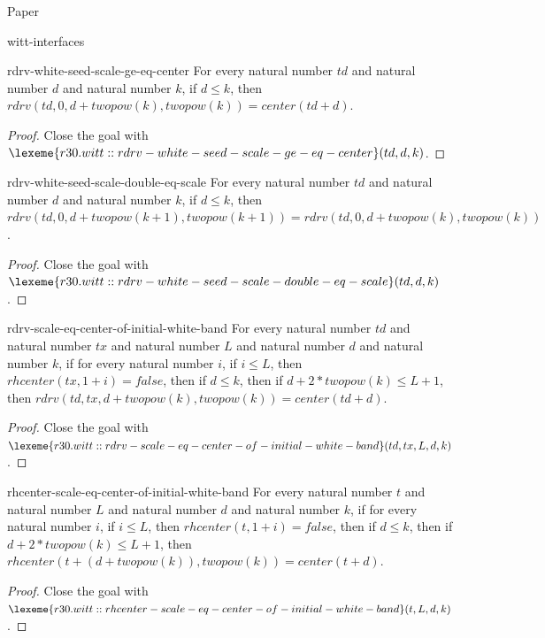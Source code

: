 \begin{lexlean}{Paper}
\begin{section}{witt-interfaces}
  \begin{theorem}{rdrv-white-seed-scale-ge-eq-center}
  For every natural number \(td\) and natural number \(d\) and natural number \(k\), if \(d ≤ k\), then \(rdrv(td, 0, d + twopow(k), twopow(k)) = center(td + d)\).
  \begin{proof}
  Close the goal with \(\lexeme{r30.witt::rdrv-white-seed-scale-ge-eq-center}(td, d, k)\).
  \end{proof}
  \end{theorem}

  \begin{theorem}{rdrv-white-seed-scale-double-eq-scale}
  For every natural number \(td\) and natural number \(d\) and natural number \(k\), if \(d ≤ k\), then \(rdrv(td, 0, d + twopow(k + 1), twopow(k + 1)) = rdrv(td, 0, d + twopow(k), twopow(k))\).
  \begin{proof}
  Close the goal with \(\lexeme{r30.witt::rdrv-white-seed-scale-double-eq-scale}(td, d, k)\).
  \end{proof}
  \end{theorem}

  \begin{theorem}{rdrv-scale-eq-center-of-initial-white-band}
  For every natural number \(td\) and natural number \(tx\) and natural number \(L\) and natural number \(d\) and natural number \(k\), if for every natural number \(i\), if \(i ≤ L\), then \(rhcenter(tx, 1 + i) = false\), then if \(d ≤ k\), then if \(d + 2 * twopow(k) ≤ L + 1\), then \(rdrv(td, tx, d + twopow(k), twopow(k)) = center(td + d)\).
  \begin{proof}
  Close the goal with \(\lexeme{r30.witt::rdrv-scale-eq-center-of-initial-white-band}(td, tx, L, d, k)\).
  \end{proof}
  \end{theorem}

  \begin{theorem}{rhcenter-scale-eq-center-of-initial-white-band}
  For every natural number \(t\) and natural number \(L\) and natural number \(d\) and natural number \(k\), if for every natural number \(i\), if \(i ≤ L\), then \(rhcenter(t, 1 + i) = false\), then if \(d ≤ k\), then if \(d + 2 * twopow(k) ≤ L + 1\), then \(rhcenter(t + (d + twopow(k)), twopow(k)) = center(t + d)\).
  \begin{proof}
  Close the goal with \(\lexeme{r30.witt::rhcenter-scale-eq-center-of-initial-white-band}(t, L, d, k)\).
  \end{proof}
  \end{theorem}


\end{section}
\end{lexlean}
